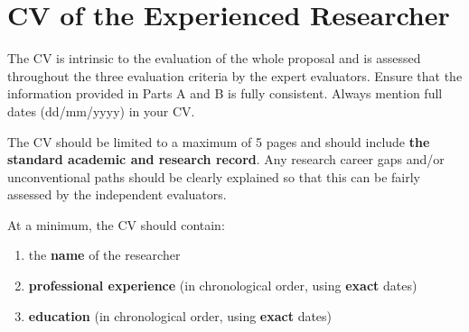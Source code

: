 
\newpage
{}
\section{CV of the Experienced Researcher}
\label{sec:cv}

The CV is intrinsic to the evaluation of the whole proposal and is
assessed throughout the three evaluation criteria by the expert
evaluators. Ensure that the information provided in Parts A and B
is fully consistent. Always mention full dates (dd/mm/yyyy) in
your CV.

\medskip\noindent
The CV should be limited to a maximum of 5 pages and should
include \textbf{the standard academic and research record}. Any
research career gaps and/or unconventional paths should be clearly
explained so that this can be fairly assessed by the independent
evaluators.

\medskip\noindent
At a minimum, the CV should contain:

\begin{enumerate}
  \item the \textbf{name} of the researcher
  \item \textbf{professional experience} (in chronological order,
  using \textbf{exact} dates)
  \item \textbf{education} (in chronological order, using
  \textbf{exact} dates)
\end{enumerate}

